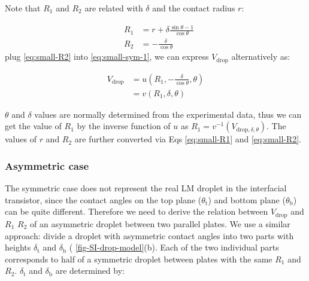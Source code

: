 Note that \(R_{1}\) and \(R_{2}\) are
related with \(\delta\) and the contact radius \(r\):

\begin{eqnarray}
\label{eq:small-R1}
&R_{1} &= {\displaystyle r + \delta \frac{\sin \theta - 1}{ \cos \theta}}  \\
\label{eq:small-R2}
&R_{2} &= -{\displaystyle \frac{\delta}{\cos \theta}}
\end{eqnarray}
plug  \autoref{eq:small-R2} into \autoref{eq:small-sym-1}, we can express
\(V_{\mathrm{drop}}\) alternatively as:

\begin{equation}
\label{eq:small-sym-2}
\begin{aligned}
V_{\mathrm{drop}} &= u(R_{1}, -\frac{\delta}{\cos \theta}, \theta)\\
                  &= v(R_{1}, \delta, \theta)
\end{aligned}
\end{equation}

\(\theta\) and \(\delta\) values are normally determined from the
experimental data, thus we can get the value of \(R_{1}\) by the inverse
function of \(u\) as \(R_{1} = v^{-1}(V_{\mathrm{drop}, \delta,
 \theta})\). The values of \(r\) and \(R_{2}\) are further converted
via Eqs \autoref{eq:small-R1} and \autoref{eq:small-R2}.

\subsubsection{Asymmetric case}
\label{sec:small-orgba3824f}
The symmetric case does not represent the real LM droplet in the
interfacial transistor, since the contact angles on the top plane
(\(\theta_{\mathrm{t}}\)) and bottom plane (\(\theta_{\mathrm{b}}\))
can be quite different. Therefore we need to derive the relation
between \(V_{\mathrm{drop}}\) and \(R_{1}\) \(R_{2}\) of an asymmetric
droplet between two parallel plates. We use a similar approach:
divide a droplet with asymmetric contact angles into two parts with
heights \(\delta_{\mathrm{t}}\) and \(\delta_{\mathrm{b}}\) (
\autoref{fig-SI-drop-model}(b). Each of the two individual parts
corresponds to half of a symmetric droplet between plates with the
same \(R_{1}\) and \(R_{2}\). \(\delta_{\mathrm{t}}\) and
\(\delta_{\mathrm{b}}\) are determined by:

